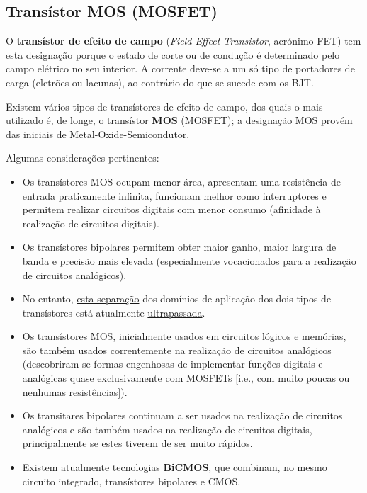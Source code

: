 \clearpage
\subsection[3.2 Transístor MOS (MOSFET)]{\hspace*{0.075 em}\raisebox{0.2 em}{$\pmb{\drsh}$} Transístor MOS (MOSFET)}
\label{subsec:transistor-MOS}

O \textbf{transístor de efeito de campo} (\textit{Field Effect Transistor}, acrónimo FET) tem esta designação porque o estado de corte ou de condução é determinado pelo campo elétrico no seu interior. A corrente deve-se a um só tipo de portadores de carga (eletrões ou lacunas), ao contrário do que se sucede com os BJT.

Existem vários tipos de transístores de efeito de campo, dos quais o mais utilizado é, de longe, o transístor \textbf{MOS} (MOSFET); a designação MOS provém das iniciais de Metal-Oxide-Semicondutor. 

\vspace{0.5em}
\noindent Algumas considerações pertinentes:
\begin{itemize}[leftmargin=*, nolistsep, itemsep=1pt, label=\rule{0.9ex}{0.9ex}]
    \item Os transístores MOS ocupam menor área, apresentam uma resistência de entrada praticamente infinita, funcionam melhor como interruptores e permitem realizar circuitos digitais com menor consumo (afinidade à realização de circuitos digitais).
    
    \item Os transístores bipolares permitem obter maior ganho, maior largura de banda e precisão mais elevada (especialmente vocacionados para a realização de circuitos analógicos). 

    \item No entanto, \underline{esta separação} dos domínios de aplicação dos dois tipos de transístores está atualmente \underline{ultrapassada}.

    \item Os transístores MOS, inicialmente usados em circuitos lógicos e memórias, são também usados correntemente na realização de circuitos analógicos (descobriram-se formas engenhosas de implementar funções digitais e analógicas quase exclusivamente com MOSFETs $[$i.e., com muito poucas ou nenhumas resistências$]$).

    \item Os transitares bipolares continuam a ser usados na realização de circuitos analógicos e são também usados na realização de circuitos digitais, principalmente se estes tiverem de ser muito rápidos. 

    \item Existem atualmente tecnologias \textbf{BiCMOS}, que combinam, no mesmo circuito integrado, transístores bipolares e CMOS.
\end{itemize}

